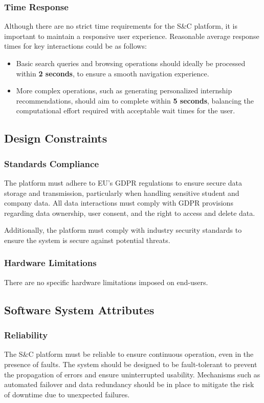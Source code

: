 \subsubsection{Time Response}
Although there are no strict time requirements for the S\&C platform, it is important to maintain a responsive user experience. Reasonable average response times for key interactions could be as follows:
\begin{itemize}
    \item Basic search queries and browsing operations should ideally be processed within \textbf{2 seconds}, to ensure a smooth navigation experience.
    \item More complex operations, such as generating personalized internship recommendations, should aim to complete within \textbf{5 seconds}, balancing the computational effort required with acceptable wait times for the user.
\end{itemize}

\subsection{Design Constraints}

\subsubsection{Standards Compliance}

The platform must adhere to EU's GDPR regulations to ensure secure data storage and transmission, particularly when handling sensitive student and company data. All data interactions must comply with GDPR provisions regarding data ownership, user consent, and the right to access and delete data.

Additionally, the platform must comply with industry security standards to ensure the system is secure against potential threats.

\subsubsection{Hardware Limitations}

There are no specific hardware limitations imposed on end-users.

\subsection{Software System Attributes}

\subsubsection{Reliability}
The S\&C platform must be reliable to ensure continuous operation, even in the presence of faults. The system should be designed to be fault-tolerant to prevent the propagation of errors and ensure uninterrupted usability. Mechanisms such as automated failover and data redundancy should be in place to mitigate the risk of downtime due to unexpected failures.

